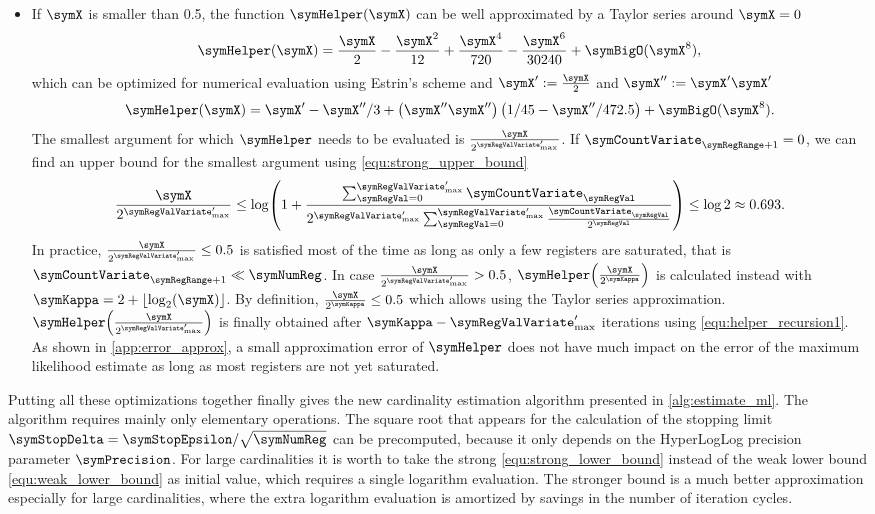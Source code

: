 \documentclass[a4paper]{scrartcl}
\begin{document}
\begin{itemize}
\item If $\symX$ is smaller than 0.5, the function $\symHelper(\symX)$ can be well approximated by a Taylor series around $\symX=0$
\begin{equation}
\symHelper(\symX)
=
\frac{\symX}{2} - \frac{\symX^2}{12} +\frac{\symX^4}{720}-\frac{\symX^6}{30240} + \symBigO(\symX^{8}),
\end{equation}
which can be optimized for numerical evaluation using Estrin's scheme and $\symX' := \frac{\symX}{2}$ and $\symX'' := \symX' \symX'$
\begin{equation}
\label{equ:taylor}
\symHelper(\symX)
=
\symX' - \symX''/3 + \left(\symX'' \symX''\right)\left(1/45-\symX''/472.5\right)
+ \symBigO(\symX^{8}).
\end{equation}
The smallest argument for which $\symHelper$ needs to be evaluated is $\frac{\symX}{2^{\symRegValVariate'_\text{max}}}$. If 
$\symCountVariate_{\symRegRange+1}=0$, we can find an upper bound for the smallest argument using \eqref{equ:strong_upper_bound}
\begin{equation}
\frac{\symX}{2^{\symRegValVariate'_\text{max}}} 
\leq
\log\!\left(
1+
\frac{\sum_{\symRegVal=0}^{\symRegValVariate'_\text{max}}\symCountVariate_\symRegVal}
{
2^{\symRegValVariate'_\text{max}}
\sum_{\symRegVal=0}^{\symRegValVariate'_\text{max}}
\frac{\symCountVariate_\symRegVal}{2^\symRegVal}
}
\right)
\leq \log 2 \approx 0.693.
\end{equation}
In practice, $\frac{\symX}{2^{\symRegValVariate'_\text{max}}}\leq0.5$ is satisfied most of the time as long as only a few registers are saturated, that is $\symCountVariate_{\symRegRange+1}\ll \symNumReg$. In case $\frac{\symX}{2^{\symRegValVariate'_\text{max}}} > 0.5$, $\symHelper\!\left(\frac{\symX}{2^{\symKappa}}\right)$ is calculated instead with $\symKappa = 2+\lfloor\log_2(\symX)\rfloor$. By definition, $\frac{\symX}{2^{\symKappa}}\leq 0.5$ which allows using the Taylor series approximation. $\symHelper\!\left(\frac{\symX}{2^{\symRegValVariate'_\text{max}}}\right)$ is finally obtained after $\symKappa -\symRegValVariate'_\text{max}$ iterations using \eqref{equ:helper_recursion1}. As shown in \cref{app:error_approx}, a small approximation error of $\symHelper$ does not have much impact on the error of the maximum likelihood estimate as long as most registers are not yet saturated.
\end{itemize}

Putting all these optimizations together finally gives the new cardinality estimation algorithm presented in \cref{alg:estimate_ml}. The algorithm requires mainly only elementary operations. The square root that appears for the calculation of the stopping limit $\symStopDelta=\symStopEpsilon/\sqrt{\symNumReg}$ can be precomputed, because it only depends on the HyperLogLog precision parameter $\symPrecision$. For large cardinalities it is worth to take the strong \eqref{equ:strong_lower_bound} instead of the weak lower bound \eqref{equ:weak_lower_bound} as initial value, which requires a single logarithm evaluation. The stronger bound is a much better approximation especially for large cardinalities, where the extra logarithm evaluation is amortized by savings in the number of iteration cycles.
\end{document}
